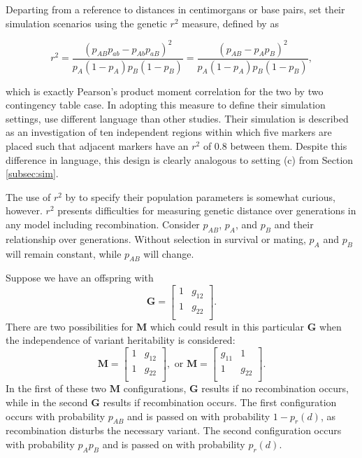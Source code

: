 \documentclass{article}
\newcommand{\m}[1]{\mathbf{#1}}               %
\begin{document}
Departing from a reference to distances in centimorgans or base pairs, \cite{LiJi2005} set their simulation scenarios using the genetic $r^2$ measure, defined by \cite{hillrobertson1968} as

\begin{equation} \label{eq:rsq}
  r^2 = \frac{\left ( p_{AB} p_{ab} - p_{Ab} p_{aB} \right )^2}{{p_A (1 - p_A) p_B (1 - p_B)}} = \frac{\left ( p_{AB} - p_A p_B \right )^2}{p_A (1 - p_A) p_B (1 - p_B)},
\end{equation}

\noindent which is exactly Pearson's product moment correlation for the two by two contingency table case. In adopting this measure to define their simulation settings, \cite{LiJi2005} use different language than other studies. Their simulation is described as an investigation of ten independent regions within which five markers are placed such that adjacent markers have an $r^2$ of 0.8 between them. Despite this difference in language, this design is clearly analogous to setting (c) from Section \ref{subsec:sim}.

The use of $r^2$ by \cite{LiJi2005} to specify their population parameters is somewhat curious, however. $r^2$ presents difficulties for measuring genetic distance over generations in any model including recombination. Consider $p_{AB}$, $p_A$, and $p_B$ and their relationship over generations. Without selection in survival or mating, $p_A$ and $p_B$ will remain constant, while $p_{AB}$ will change.

Suppose we have an offspring with
$$\m{G} = \begin{bmatrix}
  1 & g_{12} \\
  1 & g_{22} \\
\end{bmatrix}.$$
There are two possibilities for $\m{M}$ which could result in this particular $\m{G}$ when the independence of variant heritability is considered:
$$\m{M} = \begin{bmatrix}
  1 & g_{12} \\
  1 & g_{22} \\
\end{bmatrix}, \text{ or }
\m{M} = \begin{bmatrix}
  g_{11} & 1 \\
  1 & g_{22} \\
\end{bmatrix}.$$
In the first of these two $\m{M}$ configurations, $\m{G}$ results if no recombination occurs, while in the second $\m{G}$ results if recombination occurs. The first configuration occurs with probability $p_{AB}$ and is passed on with probability $1 - p_r(d)$, as recombination disturbs the necessary variant. The second configuration occurs with probability $p_Ap_B$ and is passed on with probability $p_r(d)$.
\end{document}
